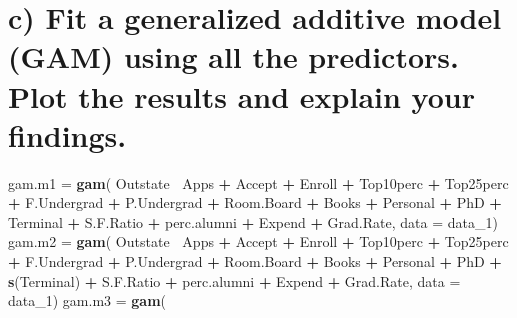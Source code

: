 \documentclass[]{article}
\newenvironment{Shaded}{\begin{snugshade}}{\end{snugshade}}
\newcommand{\DataTypeTok}[1]{\textcolor[rgb]{0.13,0.29,0.53}{#1}}
\newcommand{\DecValTok}[1]{\textcolor[rgb]{0.00,0.00,0.81}{#1}}
\newcommand{\KeywordTok}[1]{\textcolor[rgb]{0.13,0.29,0.53}{\textbf{#1}}}
\newcommand{\NormalTok}[1]{#1}
\newcommand{\OperatorTok}[1]{\textcolor[rgb]{0.81,0.36,0.00}{\textbf{#1}}}
\newcommand{\StringTok}[1]{\textcolor[rgb]{0.31,0.60,0.02}{#1}}
\begin{document}
\hypertarget{c-fit-a-generalized-additive-model-gam-using-all-the-predictors.-plot-the-results-and-explain-your-findings.}{%
\section{c) Fit a generalized additive model (GAM) using all the
predictors. Plot the results and explain your
findings.}\label{c-fit-a-generalized-additive-model-gam-using-all-the-predictors.-plot-the-results-and-explain-your-findings.}}

\begin{Shaded}
\begin{Highlighting}[]
\NormalTok{gam.m1 =}\StringTok{ }\KeywordTok{gam}\NormalTok{(}
\NormalTok{  Outstate}\OperatorTok{~}\StringTok{ }\NormalTok{Apps }\OperatorTok{+}\StringTok{ }\NormalTok{Accept }\OperatorTok{+}\StringTok{ }\NormalTok{Enroll }\OperatorTok{+}\StringTok{ }\NormalTok{Top10perc }\OperatorTok{+}\StringTok{ }\NormalTok{Top25perc }\OperatorTok{+}\StringTok{ }\NormalTok{F.Undergrad }\OperatorTok{+}\StringTok{ }\NormalTok{P.Undergrad }\OperatorTok{+}\StringTok{ }\NormalTok{Room.Board }\OperatorTok{+}\StringTok{ }\NormalTok{Books }\OperatorTok{+}\StringTok{ }\NormalTok{Personal }\OperatorTok{+}\StringTok{ }\NormalTok{PhD }\OperatorTok{+}\StringTok{ }\NormalTok{Terminal }\OperatorTok{+}\StringTok{ }\NormalTok{S.F.Ratio }\OperatorTok{+}\StringTok{ }\NormalTok{perc.alumni }\OperatorTok{+}\StringTok{ }\NormalTok{Expend }\OperatorTok{+}\StringTok{ }\NormalTok{Grad.Rate, }
  \DataTypeTok{data =}\NormalTok{ data_}\DecValTok{1}\NormalTok{)}
\NormalTok{gam.m2 =}\StringTok{ }\KeywordTok{gam}\NormalTok{(}
\NormalTok{  Outstate}\OperatorTok{~}\StringTok{ }\NormalTok{Apps }\OperatorTok{+}\StringTok{ }\NormalTok{Accept }\OperatorTok{+}\StringTok{ }\NormalTok{Enroll }\OperatorTok{+}\StringTok{ }\NormalTok{Top10perc }\OperatorTok{+}\StringTok{ }\NormalTok{Top25perc }\OperatorTok{+}\StringTok{ }\NormalTok{F.Undergrad }\OperatorTok{+}\StringTok{ }\NormalTok{P.Undergrad }\OperatorTok{+}\StringTok{ }\NormalTok{Room.Board }\OperatorTok{+}\StringTok{ }\NormalTok{Books }\OperatorTok{+}\StringTok{ }\NormalTok{Personal }\OperatorTok{+}\StringTok{ }\NormalTok{PhD }\OperatorTok{+}\StringTok{ }\KeywordTok{s}\NormalTok{(Terminal) }\OperatorTok{+}\StringTok{ }\NormalTok{S.F.Ratio }\OperatorTok{+}\StringTok{ }\NormalTok{perc.alumni }\OperatorTok{+}\StringTok{ }\NormalTok{Expend }\OperatorTok{+}\StringTok{ }\NormalTok{Grad.Rate,}
  \DataTypeTok{data =}\NormalTok{ data_}\DecValTok{1}\NormalTok{)}
\NormalTok{gam.m3 =}\StringTok{ }\KeywordTok{gam}\NormalTok{(}

\end{Highlighting}
\end{Shaded}
\end{document}
